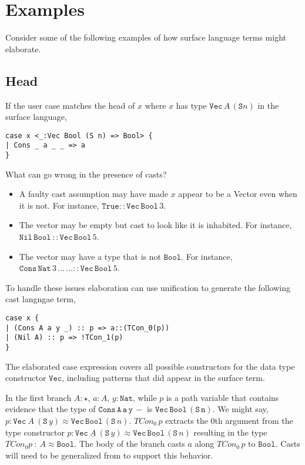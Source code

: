 \section{Examples}
 
Consider some of the following examples of how surface language terms might elaborate.
 
\subsection{Head}
 
If the user case matches the head of $x$ where $x$ has type $\mathtt{Vec}\,A\,(\mathtt{S}n)$ in the surface language,
 
\begin{lstlisting}[basicstyle={\ttfamily\small}]
case x <_:Vec Bool (S n) => Bool> {
| Cons _ a _ _ => a
}
\end{lstlisting}
 
What can go wrong in the presence of casts?
\begin{itemize}
\item
A faulty cast assumption may have made $x$ appear to be a Vector even when it is not.
For instance, $\mathtt{True}::\mathtt{Vec}\,\mathtt{Bool}\,3$.
\item
The vector may be empty but cast to look like it is inhabited.
For instance, $\mathtt{Nil}\,\mathtt{Bool}\,::\mathtt{Vec}\,\mathtt{Bool}\,5$.
\item
The vector may have a type that is not $\mathtt{Bool}$.
For instance, $\mathtt{Cons}\,\mathtt{Nat}\,3\,...\,...::\mathtt{Vec}\,\mathtt{Bool}\,5$.
\end{itemize}
 
To handle these issues elaboration can use unification to generate the following cast langngae term,
 
\begin{lstlisting}[basicstyle={\ttfamily\small}]
case x {
| (Cons A a y _) :: p => a::(TCon_0(p))
| (Nil A) :: p => !TCon_1(p)
}
\end{lstlisting}
 
The elaborated case expression covers all possible constructors for the data type constructor $\mathtt{Vec}$, including patterns that did appear in the surface term.
 
In the first branch $A:\star$, $a:A$, $y:\mathtt{Nat}$, while $p$ is a path variable that contains evidence that the type of $\mathtt{Cons\,A\,a\,y\,-}$ is $\mathtt{Vec\,Bool\,(S\,n)}$.
We might say, $p:\mathtt{Vec}\ A\ (\mathtt{S}\,y)\approx\mathtt{Vec}\,\mathtt{Bool}\,(\mathtt{S}\,n)$.
$TCon_{0}\,p$ extracts the 0th argument from the type constructor $p:\mathtt{Vec}\ \underline{A}\ (\mathtt{S}\,y)\approx\mathtt{Vec}\,\underline{\mathtt{Bool}}\,(\mathtt{S}\,n)$ resulting in the type $TCon_{0}p\ :\ A\approx\mathtt{Bool}$.
The body of the branch casts $a$ along $TCon_{0}\,p$ to $\mathtt{Bool}$.
Casts will need to be generalized from  to support this behavior.
 
